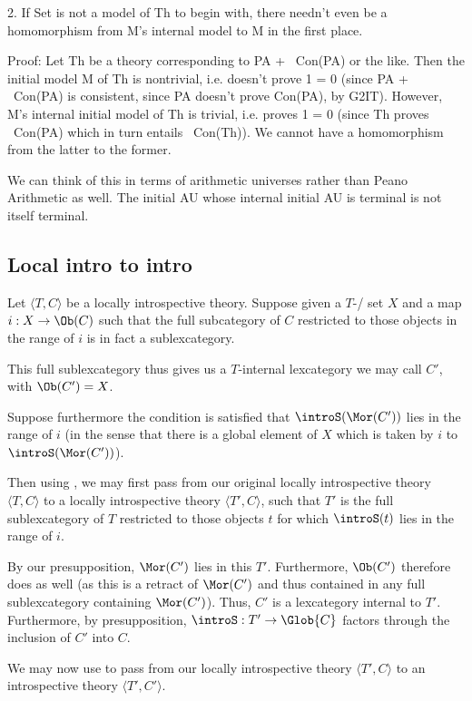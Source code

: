 \begin{TODOblock}
2. If Set is not a model of Th to begin with, there needn't even be a homomorphism from M's internal model to M in the first place.

Proof: Let Th be a theory corresponding to PA + ~Con(PA) or the like. Then the initial model M of Th is nontrivial, i.e. doesn't prove 1 = 0 (since PA + ~Con(PA) is consistent, since PA doesn't prove Con(PA), by G2IT). However, M's internal initial model of Th is trivial, i.e. proves 1 = 0 (since Th proves ~Con(PA) which in turn entails ~Con(Th)). We cannot have a homomorphism from the latter to the former.

We can think of this in terms of arithmetic universes rather than Peano Arithmetic as well. The initial AU whose internal initial AU is terminal is not itself terminal.
\end{TODOblock}

\subsection{Local intro to intro}
\begin{construction}
Let $\langle T, C \rangle$ be a locally introspective theory. Suppose given a $T$-\repsmall/ set $X$ and a map $i : X \to \Ob(C)$ such that the full subcategory of $C$ restricted to those objects in the range of $i$ is in fact a sublexcategory.

This full sublexcategory thus gives us a $T$-internal lexcategory we may call $C'$, with $\Ob(C') = X$.

Suppose furthermore the condition is satisfied that $\introS(\Mor(C'))$ lies in the range of $i$ (in the sense that there is a global element of $X$ which is taken by $i$ to $\introS(\Mor(C'))$).

Then using , we may first pass from our original locally introspective theory $\langle T, C \rangle$ to a locally introspective theory $\langle T', C \rangle$, such that $T'$ is the full sublexcategory of $T$ restricted to those objects $t$ for which $\introS(t)$ lies in the range of $i$.

By our presupposition, $\Mor(C')$ lies in this $T'$. Furthermore, $\Ob(C')$ therefore does as well (as this is a retract of $\Mor(C')$ and thus contained in any full sublexcategory containing $\Mor(C')$). Thus, $C'$ is a lexcategory internal to $T'$. Furthermore, by presupposition, $\introS : T' \to \Glob{C}$ factors through the inclusion of $C'$ into $C$.

We may now use  to pass from our locally introspective theory $\langle T', C \rangle$ to an introspective theory $\langle T', C' \rangle$.
\end{construction}

